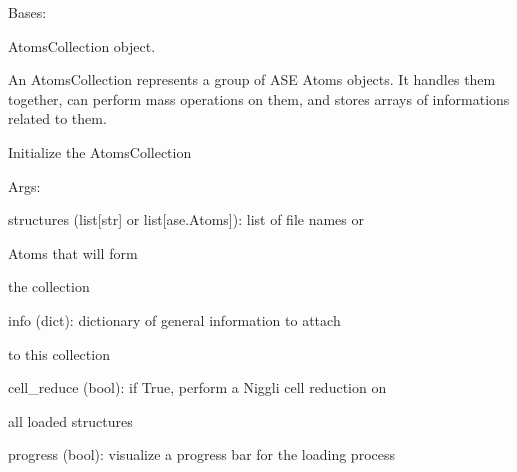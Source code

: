 \documentclass[letterpaper,10pt,english]{sphinxmanual}
\begin{document}
\begin{fulllineitems}
\label{doctree/soprano.collection.collection:soprano.collection.collection.AtomsCollection}
Bases: 

AtomsCollection object.

An AtomsCollection represents a group of ASE Atoms objects.
It handles them together, can perform mass operations on them, and stores
arrays of informations related to them.

Initialize the AtomsCollection

\begin{DUlineblock}{0em}
\item[] Args:
\item[]
\begin{DUlineblock}{\DUlineblockindent}
\item[] structures (list{[}str{]} or list{[}ase.Atoms{]}): list of file names or
\item[]
\begin{DUlineblock}{\DUlineblockindent}
\item[] Atoms that will form
\item[] the collection
\end{DUlineblock}
\item[] info (dict): dictionary of general information to attach
\item[]
\begin{DUlineblock}{\DUlineblockindent}
\item[] to this collection
\end{DUlineblock}
\item[] cell\_reduce (bool): if True, perform a Niggli cell reduction on
\item[]
\begin{DUlineblock}{\DUlineblockindent}
\item[] all loaded structures
\end{DUlineblock}
\item[] progress (bool): visualize a progress bar for the loading process
\end{DUlineblock}
\end{DUlineblock}

\begin{fulllineitems}
\label{doctree/soprano.collection.collection:soprano.collection.collection.AtomsCollection.all}
\end{fulllineitems}


\end{fulllineitems}
\end{document}

